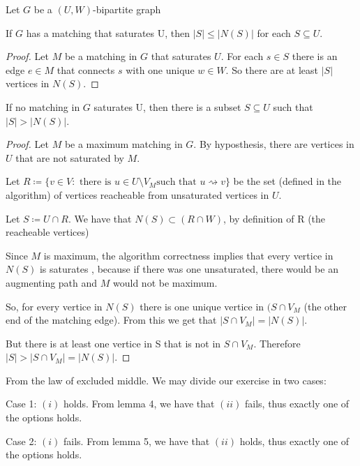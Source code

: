 \documentclass[a4paper,10pt, leqno]{article}
\begin{document}
Let $G$ be a $(U, W)$-bipartite graph

\begin{lemma}
If $G$ has a matching that saturates U, then $|S| \leq |N(S)|$ for each $S \subseteq U$.
\end{lemma}
\begin{proof}
Let $M$ be a matching in $G$ that saturates $U$.
For each $s \in S$ there is an edge $e \in M$ that connects $s$ with one unique $w \in W$. So there are at least $|S|$ vertices in $N(S)$.
\end{proof}

\begin{lemma}
If no matching in $G$ saturates U, then there is a subset $S \subseteq U$ such that $|S| > |N(S)|$.
\end{lemma}
\begin{proof}
Let $M$ be a maximum matching in $G$. By hyposthesis, there are vertices in $U$ that are not saturated by $M$.

Let $R \coloneqq\{ v \in V : \text{ there is } u \in U \setminus V_M \text{
such that } u \rightsquigarrow
v\}$ be the set (defined in the algorithm) of vertices reacheable from unsaturated vertices in $U$.

Let $S \coloneqq U \cap R$. We have that $N(S) \subset (R \cap W)$, by definition of R (the reacheable vertices)  

Since $M$ is maximum, the algorithm correctness implies that every vertice in $N(S)$ is saturates , because if there was one unsaturated, there would be an augmenting path and $M$ would not be maximum.

So, for every vertice in $N(S)$ there is one unique vertice in $(S \cap V_M$ (the other end of the matching edge). From this we get that $|S \cap V_M| = |N(S)|$.

But there is at least one vertice in S that is not in $S \cap V_M$. Therefore $|S| > |S \cap V_M| = |N(S)|$.
\end{proof}

From the law of excluded middle. We may divide our exercise in two cases:

Case 1: $(i)$ holds.
From lemma 4, we have that $(ii)$ fails, thus exactly one of the options holds.

Case 2: $(i)$ fails.
From lemma 5, we have that $(ii)$ holds, thus exactly one of the options holds.
\end{document}
